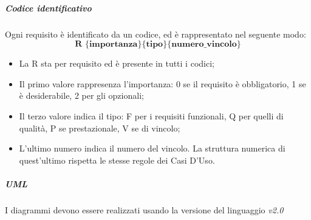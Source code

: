 			
			\subparagraph{Codice identificativo} \Spazio
			Ogni requisito è identificato da un codice, ed è rappresentato nel seguente modo:
			$$ \textbf{R \{importanza\}\{tipo\}\{numero\_vincolo\} } $$
			
			\begin{itemize}
				\item La R sta per requisito ed è presente in tutti i codici;
				\item Il primo valore rappresenza l'importanza: 0 se il requisito è obbligatorio, 1 se è desiderabile, 2 per gli opzionali;
				\item Il terzo valore indica il tipo: F per i requisiti funzionali, Q per quelli di qualità, P se prestazionale, V se di vincolo;
				\item L'ultimo numero indica il numero del vincolo. La struttura numerica di quest'ultimo rispetta le stesse regole dei Casi D'Uso.
			\end{itemize}
		
	        
		    
			\subparagraph{UML} \Spazio
			I diagrammi  devono essere realizzati usando la versione del linguaggio \textit{v2.0}
			
			
